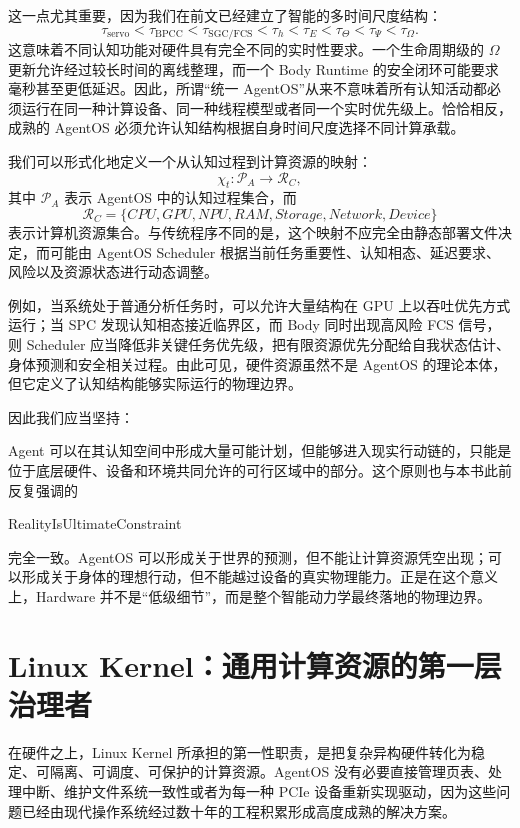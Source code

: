 这一点尤其重要，因为我们在前文已经建立了智能的多时间尺度结构：
\[
\tau_{\mathrm{servo}}
<
\tau_{\mathrm{BPCC}}
<
\tau_{\mathrm{SGC/FCS}}
<
\tau_h
<
\tau_E
<
\tau_\Theta
<
\tau_\Psi
<
\tau_\Omega.
\]
这意味着不同认知功能对硬件具有完全不同的实时性要求。一个生命周期级的 $\Omega$ 更新允许经过较长时间的离线整理，而一个 Body Runtime 的安全闭环可能要求毫秒甚至更低延迟。因此，所谓“统一 AgentOS”从来不意味着所有认知活动都必须运行在同一种计算设备、同一种线程模型或者同一个实时优先级上。恰恰相反，成熟的 AgentOS 必须允许认知结构根据自身时间尺度选择不同计算承载。

我们可以形式化地定义一个从认知过程到计算资源的映射：
\[
\chi_t:
\mathcal P_A
\rightarrow
\mathcal R_C,
\]
其中 $\mathcal P_A$ 表示 AgentOS 中的认知过程集合，而
\[
\mathcal R_C
=
\{
CPU,GPU,NPU,RAM,Storage,Network,Device
\}
\]
表示计算机资源集合。与传统程序不同的是，这个映射不应完全由静态部署文件决定，而可能由 AgentOS Scheduler 根据当前任务重要性、认知相态、延迟要求、风险以及资源状态进行动态调整。

例如，当系统处于普通分析任务时，可以允许大量结构在 GPU 上以吞吐优先方式运行；当 SPC 发现认知相态接近临界区，而 Body 同时出现高风险 FCS 信号，则 Scheduler 应当降低非关键任务优先级，把有限资源优先分配给自我状态估计、身体预测和安全相关过程。由此可见，硬件资源虽然不是 AgentOS 的理论本体，但它定义了认知结构能够实际运行的物理边界。

因此我们应当坚持：
\begin{statementbox}
\centering
{}
\end{statementbox}
Agent 可以在其认知空间中形成大量可能计划，但能够进入现实行动链的，只能是位于底层硬件、设备和环境共同允许的可行区域中的部分。这个原则也与本书此前反复强调的
\begin{statementbox}
RealityIsUltimateConstraint
\end{statementbox}
完全一致。AgentOS 可以形成关于世界的预测，但不能让计算资源凭空出现；可以形成关于身体的理想行动，但不能越过设备的真实物理能力。正是在这个意义上，Hardware 并不是“低级细节”，而是整个智能动力学最终落地的物理边界。

\section{Linux Kernel：通用计算资源的第一层治理者}

在硬件之上，Linux Kernel 所承担的第一性职责，是把复杂异构硬件转化为稳定、可隔离、可调度、可保护的计算资源。AgentOS 没有必要直接管理页表、处理中断、维护文件系统一致性或者为每一种 PCIe 设备重新实现驱动，因为这些问题已经由现代操作系统经过数十年的工程积累形成高度成熟的解决方案。

